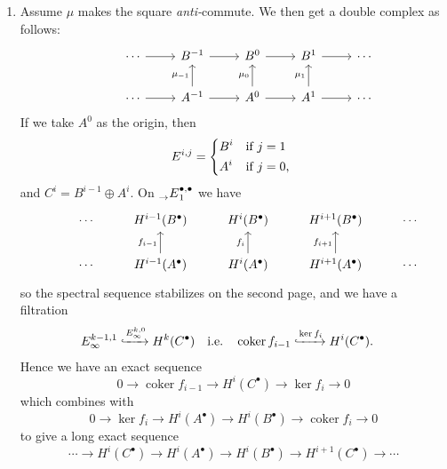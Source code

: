 \documentclass{report}
\DeclareMathOperator{\coker}{coker}
\begin{document}
\begin{enumerate}[label=\textbf{1.7.\Alph*.}]
	\item Assume $\mu$ makes the square \emph{anti-}commute. We then get a
	      double complex as follows:
	      \begin{equation*}
		      \begin{tikzcd}
			      &\cdots \ar[r] &B^{-1} \ar[r] &B^0 \ar[r] &B^1 \ar[r] &\cdots \\
			      &\cdots \ar[r] &A^{-1} \ar[u,"\mu_{-1}"] \ar[r] &A^0 \ar[u,"\mu_0"] \ar[r] &A^1 \ar[r] \ar[u,"\mu_1"] &\cdots
		      \end{tikzcd}
	      \end{equation*}
	      If we take $A^0$ as the origin, then
	      \begin{equation*}
		      E^{i,j} = \begin{dcases*}
			      B^i & if $j=1$  \\
			      A^i & if $j=0$,
		      \end{dcases*}
	      \end{equation*}
	      and $C^i=B^{i-1}\oplus A^i$. On
	      $\prescript{}{\rightarrow}E^{\bullet,\bullet}_1$ we have
	      \begin{equation*}
		      \begin{tikzcd}
			      &\cdots &H^{i-1}(B^\bullet) &H^i(B^\bullet) &H^{i+1}(B^\bullet) &\cdots \\
			      &\cdots &H^{i-1}(A^\bullet) \ar[u,"f_{i-1}"] &H^i(A^\bullet) \ar[u,"f_i"] &H^{i+1}(A^\bullet) \ar[u,"f_{i+1}"] &\cdots
		      \end{tikzcd}
	      \end{equation*}
	      so the spectral sequence stabilizes on the second page, and we have a
	      filtration
	      \begin{align*}
		       & E^{k-1,1}_\infty\xhookrightarrow{E^{k,0}_\infty}H^k(C^\bullet) &
		       & \text{i.e.}                                                    &
		       & \coker f_{i-1}\xhookrightarrow{\ker f_i}H^i(C^\bullet).
	      \end{align*}
	      Hence we have an exact sequence
	      \begin{equation*}
		      0\to\coker f_{i-1}\to H^i(C^\bullet)\to\ker f_i\to 0
	      \end{equation*}
	      which combines with
	      \begin{equation*}
		      0\to\ker f_i\to H^i(A^\bullet)\to H^i(B^\bullet)\to\coker f_i\to0
	      \end{equation*}
	      to give a long exact sequence
	      \begin{equation*}
		      \cdots\to H^i(C^\bullet)\to H^i(A^\bullet)\to H^i(B^\bullet)
		      \to H^{i+1}(C^\bullet)\to\cdots
	      \end{equation*}


\end{enumerate}
\end{document}
